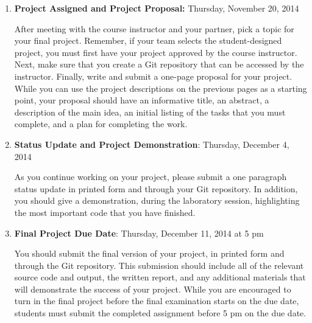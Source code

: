 \vspace*{-.05in}
\begin{enumerate}

  \itemsep0in

  \item {\bf Project Assigned and Project Proposal:} Thursday, November 20, 2014

    After meeting with the course instructor and your partner, pick a topic for your final project.  Remember, if your
    team selects the student-designed project, you must first have your project approved by the course instructor.
    Next, make sure that you create a Git repository that can be accessed by the instructor. Finally, write and submit a
    one-page proposal for your project. While you can use the project descriptions on the previous pages as a starting
    point, your proposal should have an informative title, an abstract, a description of the main idea, an initial
    listing of the tasks that you must complete, and a plan for completing the work.

  \item {\bf Status Update and Project Demonstration}: Thursday, December 4, 2014

    As you continue working on your project, please submit a one paragraph status update in printed form and through
    your Git repository.  In addition, you should give a demonstration, during the laboratory session, highlighting the
    most important code that you have finished. 

  \item {\bf Final Project Due Date}: Thursday, December 11, 2014 at 5 pm

    You should submit the final version of your project, in printed form and through the Git repository. This submission
    should include all of the relevant source code and output, the written report, and any additional materials that
    will demonstrate the success of your project.  While you are encouraged to turn in the final project before the
    final examination starts on the due date, students must submit the completed assignment before 5 pm on the due date.

\end{enumerate}
\vspace*{-.05in}


